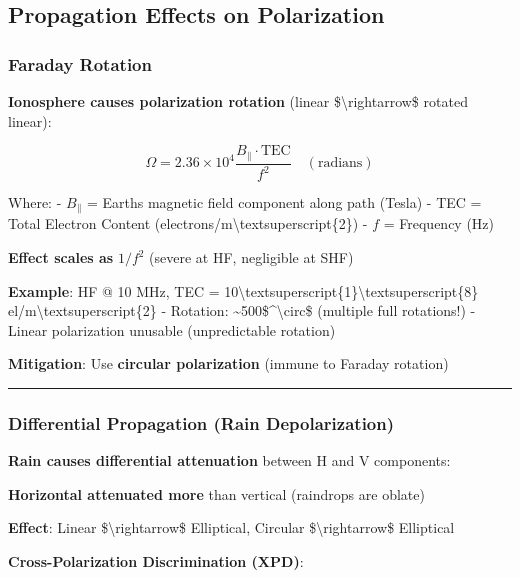 \subsection{Propagation Effects on
Polarization}\label{propagation-effects-on-polarization}

\subsubsection{Faraday Rotation}\label{faraday-rotation}

\textbf{Ionosphere causes polarization rotation} (linear
\$\textbackslash rightarrow\$ rotated linear):

\[
\Omega = 2.36 \times 10^4 \frac{B_\parallel \cdot \text{TEC}}{f^2} \quad (\text{radians})
\]

Where: - \(B_\parallel\) = Earth\textquotesingle s magnetic field
component along path (Tesla) - TEC = Total Electron Content
(electrons/m\textbackslash textsuperscript\{2\}) - \(f\) = Frequency
(Hz)

\textbf{Effect scales as} \(1/f^2\) (severe at HF, negligible at SHF)

\textbf{Example}: HF @ 10 MHz, TEC =
10\textbackslash textsuperscript\{1\}\textbackslash textsuperscript\{8\}
el/m\textbackslash textsuperscript\{2\} - Rotation:
\textasciitilde500\$\^{}\textbackslash circ\$ (multiple full rotations!)
- Linear polarization unusable (unpredictable rotation)

\textbf{Mitigation}: Use \textbf{circular polarization} (immune to
Faraday rotation)

\begin{center}\rule{0.5\linewidth}{0.5pt}\end{center}

\subsubsection{Differential Propagation (Rain
Depolarization)}\label{differential-propagation-rain-depolarization}

\textbf{Rain causes differential attenuation} between H and V
components:

\textbf{Horizontal attenuated more} than vertical (raindrops are oblate)

\textbf{Effect}: Linear \$\textbackslash rightarrow\$ Elliptical,
Circular \$\textbackslash rightarrow\$ Elliptical

\textbf{Cross-Polarization Discrimination (XPD)}:

